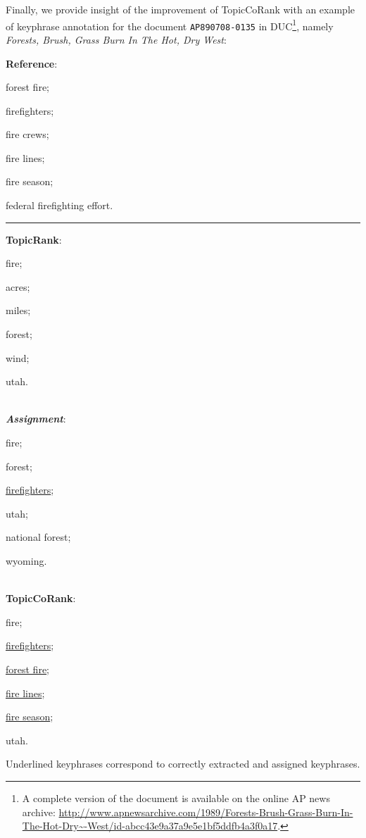     Finally, we provide insight of the improvement of TopicCoRank with an example of
    keyphrase annotation for the document \texttt{AP890708-0135} in DUC\footnote{A
    complete version of the document is available on the online AP news archive:
    \scriptsize\url{http://www.apnewsarchive.com/1989/Forests-Brush-Grass-Burn-In-The-Hot-Dry~-West/id-abcc43e9a37a9e5e1bf5ddfb4a3f0a17}.},
    namely \textit{Forests, Brush, Grass Burn In The Hot, Dry West}:
    \begin{center}
        \begin{varwidth}{.9\linewidth}
            \textbf{Reference}:
            \begin{enumerate*}
                \item{forest fire;}
                \item{firefighters;}
                \item{fire crews;}
                \item{fire lines;}
                \item{fire season;}
                \item{federal firefighting effort.}
            \end{enumerate*}
            \noindent\rule[0.5ex]{\linewidth}{.5pt}
            \textbf{TopicRank}:
            \begin{enumerate*}
                \item{fire;}
                \item{acres;}
                \item{miles;}
                \item{forest;}
                \item{wind;}
                \item{utah.}
            \end{enumerate*}\\
            \textbf{\textit{Assignment}}:
            \begin{enumerate*}
                \item{fire;}
                \item{forest;}
                \item{\underline{firefighters};}
                \item{utah;}
                \item{national forest;}
                \item{wyoming.}
            \end{enumerate*}\\
            \textbf{TopicCoRank}:
            \begin{enumerate*}
                \item{fire;}
                \item{\underline{firefighters};}
                \item{\underline{forest fire};}
                \item{\underline{fire lines};}
                \item{\underline{fire season};}
                \item{utah}.
            \end{enumerate*}
        \end{varwidth}
    \end{center}
    Underlined keyphrases correspond to correctly extracted and assigned keyphrases.
